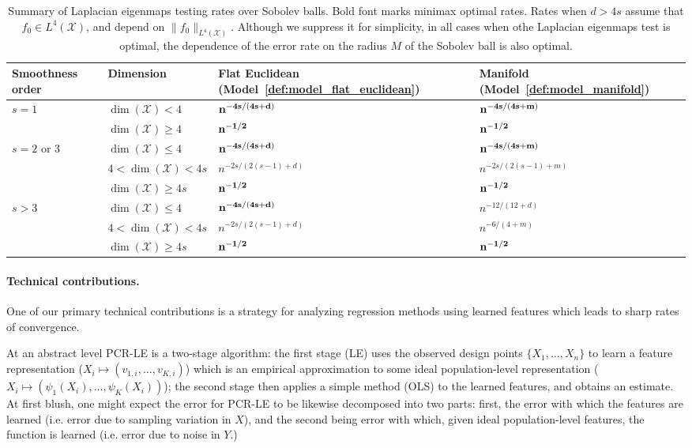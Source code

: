 \documentclass{article}
\theoremstyle{definition}
\newcommand{\mc}[1]{\mathcal{#1}}
\newcommand{\1}{\mathbf{1}}
\begin{document}
	\begin{table}
		\begin{center}
			\begin{tabular}{p{.175\textwidth} p{} | p{} p{} }
				Smoothness order & Dimension & Flat Euclidean (Model~\ref{def:model_flat_euclidean}) & Manifold (Model~\ref{def:model_manifold}) \\
				\hline
				\multirow{2}{*}{$s = 1$} & $\dim(\mc{X}) < 4$ & ${\bf n^{-4s/(4s + d)}}$ & ${\bf n^{-4s/(4s + m)}}$ \\
				& $\dim(\mc{X}) \geq 4$ & ${\bf n^{-1/2}}$ & ${\bf n^{-1/2}}$ \\
				\hline
				\multirow{3}{*}{$s = 2$ or $3$} & $\dim(\mc{X}) \leq 4$  & ${\bf n^{-4s/(4s + d)}}$ & ${\bf n^{-4s/(4s + m)}}$ \\
				& $4 <\dim(\mc{X}) < 4s$  & $n^{-2s/(2(s - 1) + d)}$ & $n^{-2s/(2(s - 1) + m)}$\\
				& $\dim(\mc{X}) \geq 4s$ & ${\bf n^{-1/2}}$ & ${\bf n^{-1/2}}$ \\
				\hline
				\multirow{3}{*}{$s > 3$} & $\dim(\mc{X}) \leq 4$ & ${\bf n^{-4s/(4s + d)}}$ & $n^{-12/(12 + d)}$ \\
				& $4 < \dim(\mc{X}) < 4s$ & $n^{-2s/(2(s - 1) + d)}$ & $n^{-6/(4 + m)}$ \\
				& $\dim(\mc{X}) \geq 4s$ & ${\bf n^{-1/2}}$ & ${\bf n^{-1/2}}$ \\
			\end{tabular}
		\end{center}
		\caption{Summary of Laplacian eigenmaps testing rates over Sobolev balls. Bold font marks minimax optimal rates. Rates when $d > 4s$ assume that $f_0 \in L^4(\mc{X})$, and depend on $\|f_0\|_{L^4(\mc{X})}$. Although we suppress it for simplicity, in all cases when othe Laplacian eigenmaps test is optimal, the dependence of the error rate on the radius $M$ of the Sobolev ball is also optimal.}
		\label{tbl:testing_rates}
	\end{table}
	
	\paragraph{Technical contributions.}
	One of our primary technical contributions is a strategy for analyzing regression methods using learned features which leads to sharp rates of convergence. 
	
	At an abstract level PCR-LE is a two-stage algorithm: the first stage (LE) uses the observed design points $\{X_1,\ldots,X_n\}$ to learn a feature representation ($X_i \mapsto (v_{1,i},\ldots,v_{K,i})$) which is an empirical approximation to some ideal population-level representation ($X_i \mapsto (\psi_{1}(X_i),\ldots,\psi_{K}(X_i))$);  the second stage then applies a simple method (OLS) to the learned features, and obtains an estimate. At first blush, one might expect the error for PCR-LE to be likewise decomposed into two parts: first, the error with which the features are learned (i.e. error due to sampling variation in $X$), and the second being error with which, given ideal population-level features, the function is learned (i.e. error due to noise in $Y$.) 
	
\end{document}
